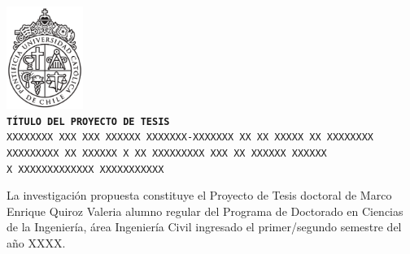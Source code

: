 \documentclass[11pt,letterpaper]{article}
\begin{document}
\renewcommand{\tablename}{Tabla}
\pagestyle{fancy}
\textheight
%
\fancyhead{} %
\rhead{} %
\cfoot{\texttt{\thepage}}

\vspace*{10mm}

\begin{center} 
\includegraphics[width=2.5cm]{logo/logo.pdf} \\
\vspace{7.5mm}
\texttt{{\LARGE\textbf{TÍTULO DEL PROYECTO DE TESIS}}} \\
\vspace{10mm}
\doublespacing
\texttt{{\large \uppercase{xxxxxxxx xxx xxx xxxxxx xxxxxxx-xxxxxxx Xx xx xxxxx xx xxxxxxxx xxxxxxxxx xx xxxxxx x xx xxxxxxxxx xxx xx xxxxxx xxxxxx\\ x xxxxxxxxxxxxx xxxxxxxxxxx}}}
\end{center}

\vspace{10mm}
\doublespacing
{\large \noindent La investigación propuesta constituye el Proyecto de Tesis doctoral de Marco Enrique Quiroz Valeria alumno regular del Programa de Doctorado en Ciencias de la Ingeniería, área Ingeniería Civil ingresado el primer/segundo semestre del año XXXX.}

\singlespacing

\vspace{30mm}

\hspace{0.75cm}
\hspace{8cm}
\end{document}
